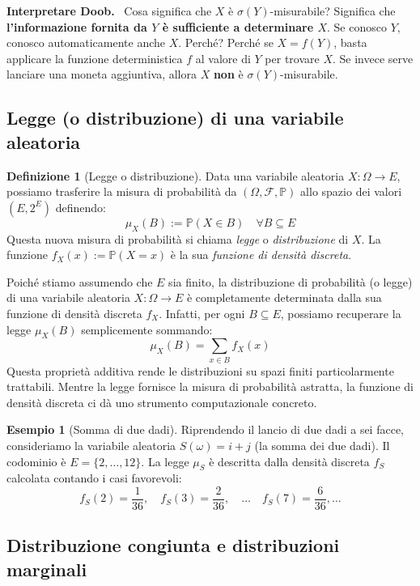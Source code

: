\documentclass[11pt, a4paper]{report}
\theoremstyle{plain}
\theoremstyle{definition}
\newtheorem{definition}[theorem]{Definizione}
\newtheorem{esempio}[theorem]{Esempio}
\theoremstyle{remark}
\newenvironment{hint}[1][Hint]
{\begin{mdframed}[backgroundcolor=blue!5, linecolor=blue!50, linewidth=2pt, topline=false, rightline=false, bottomline=false]
\textbf{\textsf{#1.}}\ }
{\end{mdframed}}
\newcommand{\PP}{\mathbb{P}}
\newcommand{\F}{\mathcal{F}}
\newcommand{\1}{\mathbf{1}}
\begin{document}
\begin{hint}[Interpretare Doob]
    Cosa significa che $X$ è $\sigma(Y)$-misurabile? 
    Significa che \textbf{l'informazione fornita da $Y$ è sufficiente a determinare $X$}. Se conosco $Y$, conosco automaticamente anche $X$. 
    Perché? Perché se $X = f(Y)$, basta applicare la funzione deterministica $f$ al valore di $Y$ per trovare $X$. Se invece serve lanciare una moneta aggiuntiva, allora $X$ \textbf{non} è $\sigma(Y)$-misurabile.
\end{hint}

\subsection{Legge (o distribuzione) di una variabile aleatoria}

\begin{definition}[Legge o distribuzione]
Data una variabile aleatoria $X : \Omega \to E$, possiamo trasferire la misura di probabilità da $(\Omega, \F, \PP)$ allo spazio dei valori $(E, 2^E)$ definendo:
\[ \mu_X(B) := \PP(X \in B) \quad \forall B \subseteq E \]
Questa nuova misura di probabilità si chiama \emph{legge} o \emph{distribuzione} di $X$.
La funzione $f_X(x) := \PP(X = x)$ è la sua \emph{funzione di densità discreta}.
\end{definition}

Poiché stiamo assumendo che $E$ sia finito, la distribuzione di probabilità (o legge) di una variabile aleatoria $X : \Omega \to E$ è completamente determinata dalla sua funzione di densità discreta $f_X$. Infatti, per ogni $B \subseteq E$, possiamo recuperare la legge $\mu_X(B)$ semplicemente sommando:
\[ \mu_X(B) = \sum_{x \in B} f_X(x) \]
Questa proprietà additiva rende le distribuzioni su spazi finiti particolarmente trattabili. Mentre la legge fornisce la misura di probabilità astratta, la funzione di densità discreta ci dà uno strumento computazionale concreto.

\begin{esempio}[Somma di due dadi]
Riprendendo il lancio di due dadi a sei facce, consideriamo la variabile aleatoria $S(\omega) = i + j$ (la somma dei due dadi). Il codominio è $E = \{2, \dots, 12\}$. La legge $\mu_S$ è descritta dalla densità discreta $f_S$ calcolata contando i casi favorevoli:
\[ f_S(2) = \frac{1}{36}, \quad f_S(3) = \frac{2}{36}, \quad \dots \quad f_S(7) = \frac{6}{36}, \dots \]
\end{esempio}

\subsection{Distribuzione congiunta e distribuzioni marginali}
\end{document}
